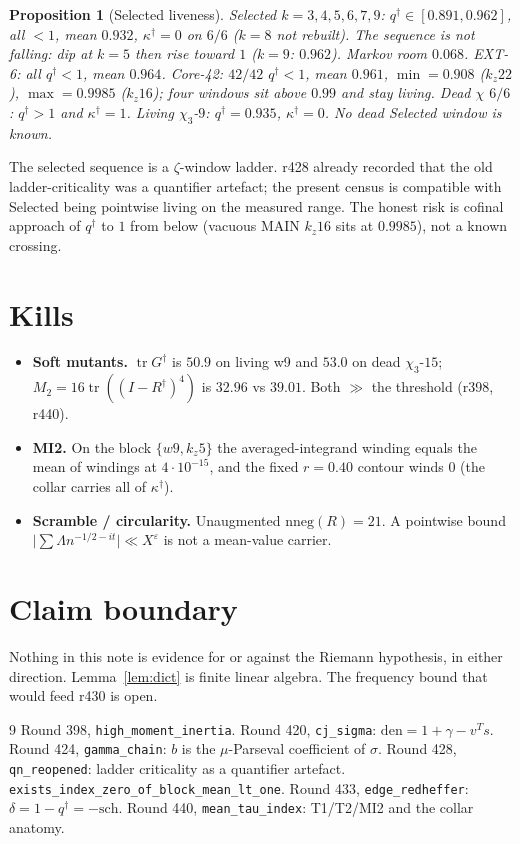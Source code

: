 \documentclass[11pt]{article}
\newtheorem{prop}{Proposition}
\theoremstyle{remark}
\newcommand{\Rd}{R^{\dagger}}
\newcommand{\qd}{q^{\dagger}}
\newcommand{\kapd}{\kappa^{\dagger}}
\newcommand{\Gd}{G^{\dagger}}
\begin{document}
\begin{prop}[Selected liveness]\label{prop:census}
Selected $k=3,4,5,6,7,9$: $\qd\in[0.891,0.962]$, all
$<1$, mean $0.932$, $\kapd=0$ on $6/6$
($k=8$ not rebuilt).
The sequence is \emph{not} falling: dip at $k=5$ then
rise toward $1$ ($k=9$: $0.962$).  Markov room $0.068$.
EXT-6: all $\qd<1$, mean $0.964$.
Core-42: $42/42$ $\qd<1$, mean $0.961$,
$\min=0.908$ ($k_{z}22$), $\max=0.9985$ ($k_{z}16$);
four windows sit above $0.99$ and stay living.
Dead $\chi$ $6/6$: $\qd>1$ and $\kapd=1$.
Living $\chi_{3}$-$9$: $\qd=0.935$, $\kapd=0$.
No dead Selected window is known.
\end{prop}

The selected sequence is a $\zeta$-window ladder.
r428 already recorded that the old ladder-criticality
was a quantifier artefact; the present census is
compatible with Selected being pointwise living on the
measured range.  The honest risk is cofinal approach
of $\qd$ to $1$ from below (vacuous MAIN $k_{z}16$ sits
at $0.9985$), not a known crossing.

\section{Kills}\label{sec:kills}

\begin{itemize}
\item \textbf{Soft mutants.}
$\operatorname{tr}\Gd$ is $50.9$ on living w9 and $53.0$
on dead $\chi_{3}$-$15$; $M_{2}=16\operatorname{tr}((I-\Rd)^{4})$
is $32.96$ vs $39.01$.  Both $\gg$ the threshold
(r398, r440).
\item \textbf{MI2.}
On the block $\{w9,k_{z}5\}$ the averaged-integrand
winding equals the mean of windings at $4\cdot 10^{-15}$,
and the fixed $r=0.40$ contour winds $0$ (the collar
carries all of $\kapd$).
\item \textbf{Scramble / circularity.}
Unaugmented $\mathrm{nneg}(R)=21$.  A pointwise bound
$\lvert\sum\Lambda n^{-1/2-it}\rvert\ll X^{\varepsilon}$
is not a mean-value carrier.
\end{itemize}

\section*{Claim boundary}

Nothing in this note is evidence for or against the
Riemann hypothesis, in either direction.
Lemma~\ref{lem:dict} is finite linear algebra.
The frequency bound that would feed r430 is open.

\begin{thebibliography}{9}
 Round 398, \texttt{high\_moment\_inertia}.
 Round 420, \texttt{cj\_sigma}:
  $\mathrm{den}=1+\gamma-v^{T}s$.
 Round 424, \texttt{gamma\_chain}:
  $b$ is the $\mu$-Parseval coefficient of $\sigma$.
 Round 428, \texttt{qn\_reopened}:
  ladder criticality as a quantifier artefact.
 \texttt{exists\_index\_zero\_of\_block\_mean\_lt\_one}.
 Round 433, \texttt{edge\_redheffer}:
  $\delta=1-\qd=-\mathrm{sch}$.
 Round 440, \texttt{mean\_tau\_index}:
  T1/T2/MI2 and the collar anatomy.
\end{thebibliography}
\end{document}
